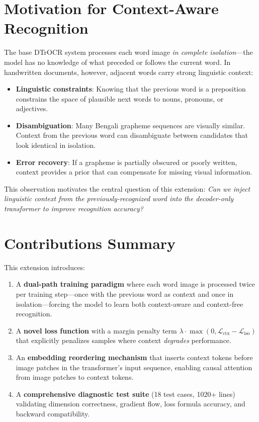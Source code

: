 \documentclass[11pt, a4paper]{report}
\begin{document}
\section{Motivation for Context-Aware Recognition}
\label{sec:motivation}

The base DTrOCR system processes each word image \emph{in complete isolation}---the model has no knowledge of what preceded or follows the current word. In handwritten documents, however, adjacent words carry strong linguistic context:

\begin{itemize}[leftmargin=2em]
  \item \textbf{Linguistic constraints}: Knowing that the previous word is a preposition constrains the space of plausible next words to nouns, pronouns, or adjectives.
  \item \textbf{Disambiguation}: Many Bengali grapheme sequences are visually similar. Context from the previous word can disambiguate between candidates that look identical in isolation.
  \item \textbf{Error recovery}: If a grapheme is partially obscured or poorly written, context provides a prior that can compensate for missing visual information.
\end{itemize}

This observation motivates the central question of this extension: \emph{Can we inject linguistic context from the previously-recognized word into the decoder-only transformer to improve recognition accuracy?}

\section{Contributions Summary}
\label{sec:contributions}

This extension introduces:
\begin{enumerate}[leftmargin=2em]
  \item A \textbf{dual-path training paradigm} where each word image is processed twice per training step---once with the previous word as context and once in isolation---forcing the model to learn both context-aware and context-free recognition.
  \item A \textbf{novel loss function} with a margin penalty term $\lambda \cdot \max(0, \mathcal{L}_{\mathrm{ctx}} - \mathcal{L}_{\mathrm{iso}})$ that explicitly penalizes samples where context \emph{degrades} performance.
  \item An \textbf{embedding reordering mechanism} that inserts context tokens before image patches in the transformer's input sequence, enabling causal attention from image patches to context tokens.
  \item A \textbf{comprehensive diagnostic test suite} (18 test cases, 1020+ lines) validating dimension correctness, gradient flow, loss formula accuracy, and backward compatibility.
\end{enumerate}
\end{document}
